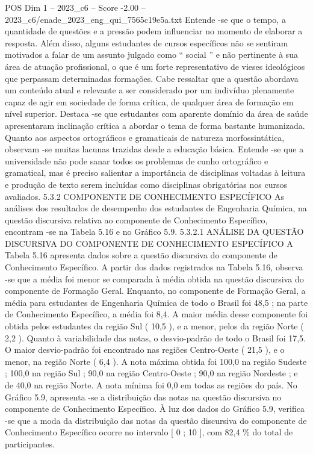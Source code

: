 \begin{textsample}{POS Dim 1 – 2023\_c6 – Score -2.00 – 2023\_c6/enade\_2023\_eng\_qui\_7565c19e5a.txt}
Entende -se que o tempo, a quantidade de questões e a pressão podem influenciar no momento de elaborar a resposta.
Além disso, alguns estudantes de cursos específicos não se sentiram motivados a falar de um assunto julgado como “ social ” e não pertinente à sua área de atuação profissional, o que é um forte representativo de vieses ideológicos que perpassam determinadas formações.
Cabe ressaltar que a questão abordava um conteúdo atual e relevante a ser considerado por um indivíduo plenamente capaz de agir em sociedade de forma crítica, de qualquer área de formação em nível superior.
Destaca -se que estudantes com aparente domínio da área de saúde apresentaram inclinação crítica a abordar o tema de forma bastante humanizada.
Quanto aos aspectos ortográficos e gramaticais de natureza morfossintática, observam -se muitas lacunas trazidas desde a educação básica.
Entende -se que a universidade não pode sanar todos os problemas de cunho ortográfico e gramatical, mas é preciso salientar a importância de disciplinas voltadas à leitura e produção de texto serem incluídas como disciplinas obrigatórias nos cursos avaliados. 5.3.2 COMPONENTE DE CONHECIMENTO ESPECÍFICO As análises dos resultados de desempenho dos estudantes de Engenharia Química, na questão discursiva relativa ao componente de Conhecimento Específico, encontram -se na Tabela 5.16 e no Gráfico 5.9. 5.3.2.1 ANÁLISE DA QUESTÃO DISCURSIVA DO COMPONENTE DE CONHECIMENTO ESPECÍFICO A Tabela 5.16 apresenta dados sobre a questão discursiva do componente de Conhecimento Específico.
A partir dos dados registrados na Tabela 5.16, observa -se que a média foi menor se comparada à média obtida na questão discursiva do componente de Formação Geral.
Enquanto, no componente de Formação Geral, a média para estudantes de Engenharia Química de todo o Brasil foi 48,5 ; na parte de Conhecimento Específico, a média foi 8,4.
A maior média desse componente foi obtida pelos estudantes da região Sul ( 10,5 ), e a menor, pelos da região Norte ( 2,2 ).
Quanto à variabilidade das notas, o desvio-padrão de todo o Brasil foi 17,5.
O maior desvio-padrão foi encontrado nas regiões Centro-Oeste ( 21,5 ), e o menor, na região Norte ( 6,4 ).
A nota máxima obtida foi 100,0 na região Sudeste ; 100,0 na região Sul ; 90,0 na região Centro-Oeste ; 90,0 na região Nordeste ; e de 40,0 na região Norte.
A nota mínima foi 0,0 em todas as regiões do país.
No Gráfico 5.9, apresenta -se a distribuição das notas na questão discursiva no componente de Conhecimento Específico.
À luz dos dados do Gráfico 5.9, verifica -se que a moda da distribuição das notas da questão discursiva do componente de Conhecimento Específico ocorre no intervalo [ 0 ; 10 ], com 82,4 \% do total de participantes.

\end{textsample}

